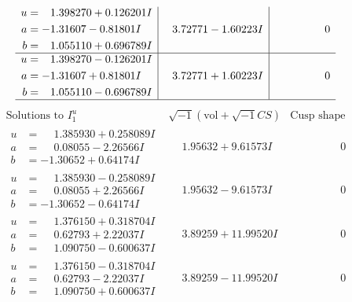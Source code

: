 \documentclass[1p]{elsarticle_modified}
\theoremstyle{definition}
\newcommand{\I}{\sqrt{-1}}
\begin{document}
$$\begin{array}{c|c|c}
\begin{aligned}
u &= \phantom{-}1.398270 + 0.126201 I \\
a &= -1.31607 - 0.81801 I \\
b &= \phantom{-}1.055110 + 0.696789 I\end{aligned}
 & \phantom{-}3.72771 - 1.60223 I & \phantom{-0.000000 } 0 \\ \hline\begin{aligned}
u &= \phantom{-}1.398270 - 0.126201 I \\
a &= -1.31607 + 0.81801 I \\
b &= \phantom{-}1.055110 - 0.696789 I\end{aligned}
 & \phantom{-}3.72771 + 1.60223 I & \phantom{-0.000000 } 0\\
 \hline 
 \end{array}$$\newpage$$\begin{array}{c|c|c}  
\text{Solutions to }I^u_{1}& \I (\text{vol} + \sqrt{-1}CS) & \text{Cusp shape}\\
 \hline 
\begin{aligned}
u &= \phantom{-}1.385930 + 0.258089 I \\
a &= \phantom{-}0.08055 - 2.26566 I \\
b &= -1.30652 + 0.64174 I\end{aligned}
 & \phantom{-}1.95632 + 9.61573 I & \phantom{-0.000000 } 0 \\ \hline\begin{aligned}
u &= \phantom{-}1.385930 - 0.258089 I \\
a &= \phantom{-}0.08055 + 2.26566 I \\
b &= -1.30652 - 0.64174 I\end{aligned}
 & \phantom{-}1.95632 - 9.61573 I & \phantom{-0.000000 } 0 \\ \hline\begin{aligned}
u &= \phantom{-}1.376150 + 0.318704 I \\
a &= \phantom{-}0.62793 + 2.22037 I \\
b &= \phantom{-}1.090750 - 0.600637 I\end{aligned}
 & \phantom{-}3.89259 + 11.99520 I & \phantom{-0.000000 } 0 \\ \hline\begin{aligned}
u &= \phantom{-}1.376150 - 0.318704 I \\
a &= \phantom{-}0.62793 - 2.22037 I \\
b &= \phantom{-}1.090750 + 0.600637 I\end{aligned}
 & \phantom{-}3.89259 - 11.99520 I & \phantom{-0.000000 } 0 \\ \hline\begin{aligned}

\end{aligned}
\end{array}$$
\end{document}
